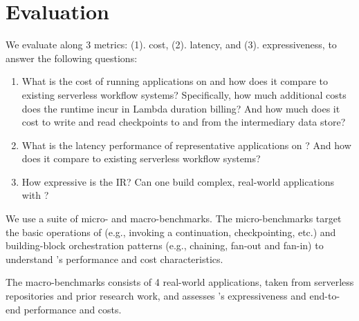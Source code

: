 
\section{Evaluation}\label{sec:eval}

We evaluate \name{} along 3 metrics: (1). cost, (2). latency, and (3).
expressiveness, to answer the following questions:

\begin{enumerate}

    \item What is the cost of running applications on \name{} and how does it
    compare to existing serverless workflow systems? Specifically, how much
    additional costs does the \name{} runtime incur in Lambda duration
    billing? And how much does it cost to write and read checkpoints to and
    from the intermediary data store?

    \item What is the latency performance of representative applications on
    \name{}? And how does it compare to existing serverless workflow systems?

    \item How expressive is the \name{} IR? Can one build complex, real-world
    applications with \name{}? 

\end{enumerate}


We use a suite of micro- and macro-benchmarks. The micro-benchmarks target the
basic operations of \name{} (e.g., invoking a continuation, checkpointing,
etc.) and building-block orchestration patterns (e.g., chaining, fan-out and
fan-in) to understand \name{}'s performance and cost characteristics.

The macro-benchmarks consists of 4 real-world applications, taken from
serverless repositories and prior research work, and assesses \name{}'s
expressiveness and end-to-end performance and costs.





